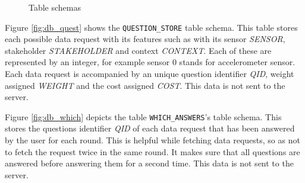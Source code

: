 \begin{figure}[htp]
\hspace{1em}
\caption{Table schemas}
\label{fig:ts1}
\end{figure}

Figure \ref{fig:db_quest} shows the \texttt{QUESTION\_STORE} table schema. This table stores each possible data request with its features such as with its sensor \textit{SENSOR}, stakeholder \textit{STAKEHOLDER} and context \textit{CONTEXT}. Each of these are represented by an integer, for example sensor 0 stands for accelerometer sensor. Each data request is accompanied by
an unique question identifier \textit{QID}, weight assigned \textit{WEIGHT} and the cost assigned \textit{COST}. This data is not sent to 
the server.

Figure \ref{fig:db_which} depicts the table \texttt{WHICH\_ANSWERS}'s table schema. This stores the questions identifier \textit{QID} of each data request that has
been answered by the user for each round. This is helpful while fetching data requests, so as not to fetch the request twice in the same round. It makes sure that all questions are answered before answering them for a second time. This data is not sent to the server.

